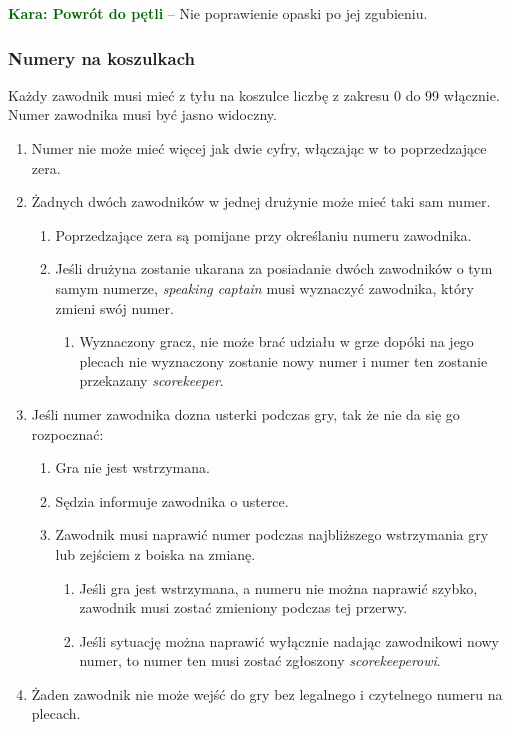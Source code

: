 \documentclass[11pt,a4paper]{article}
\newcommand\penaltyd[2]{\bgroup\textcolor{darkgreen}{\textbf{Kara: #1}} -- #2}
\begin{document}
\penaltyd{Powrót do pętli}{Nie poprawienie opaski po jej zgubieniu.}

\subsubsection{Numery na koszulkach}
Każdy zawodnik musi mieć z tyłu na koszulce liczbę z zakresu 0 do 99 włącznie. Numer zawodnika musi być jasno widoczny.
\begin{enumerate}
  \item Numer nie może mieć więcej jak dwie cyfry, włączając w to poprzedzające zera.
  \item Żadnych dwóch zawodników w jednej drużynie może mieć taki sam numer.
  \begin{enumerate}
    \item Poprzedzające zera są pomijane przy określaniu numeru zawodnika.
    \item Jeśli drużyna zostanie ukarana za posiadanie dwóch zawodników o tym samym numerze, \emph{speaking captain} musi wyznaczyć zawodnika, który zmieni swój numer.
    \begin{enumerate}
      \item Wyznaczony gracz, nie może brać udziału w grze dopóki na jego plecach nie wyznaczony zostanie nowy numer i numer ten zostanie przekazany \emph{scorekeeper}.
    \end{enumerate}
  \end{enumerate}
  \item Jeśli numer zawodnika dozna usterki podczas gry, tak że nie da się go rozpocznać:
  \begin{enumerate}
    \item Gra nie jest wstrzymana.
    \item Sędzia informuje zawodnika o usterce.
    \item Zawodnik musi naprawić numer podczas najbliższego wstrzymania gry lub zejściem z boiska na zmianę.
    \begin{enumerate}
      \item Jeśli gra jest wstrzymana, a numeru nie można naprawić szybko, zawodnik musi zostać zmieniony podczas tej przerwy.
      \item Jeśli sytuację można naprawić wyłącznie nadając zawodnikowi nowy numer, to numer ten musi zostać zgłoszony \emph{scorekeeperowi}.
    \end{enumerate}
  \end{enumerate}
  \item Żaden zawodnik nie może wejść do gry bez legalnego i czytelnego numeru na plecach.
\end{enumerate}
\end{document}
